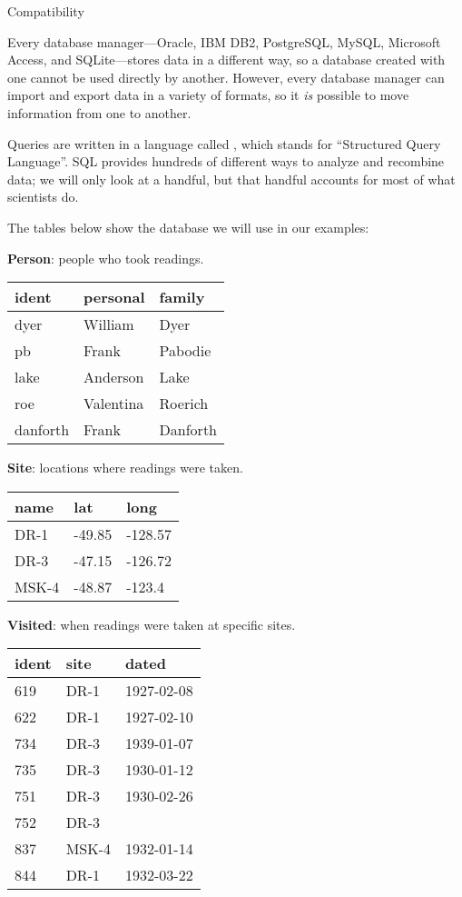 \documentclass{book}
\begin{document}
\begin{swcbox}{Compatibility}

Every database manager---Oracle, IBM DB2, PostgreSQL, MySQL, Microsoft
Access, and SQLite---stores data in a different way, so a database
created with one cannot be used directly by another. However, every
database manager can import and export data in a variety of formats, so
it \emph{is} possible to move information from one to another.

\end{swcbox}

Queries are written in a language called , which
stands for ``Structured Query Language''. SQL provides hundreds of
different ways to analyze and recombine data; we will only look at a
handful, but that handful accounts for most of what scientists do.

The tables below show the database we will use in our examples:

\textbf{Person}: people who took readings.

\begin{tabular}{lll}
ident & personal & family \\
\hline
dyer & William & Dyer \\
pb & Frank & Pabodie \\
lake & Anderson & Lake \\
roe & Valentina & Roerich \\
danforth & Frank & Danforth \\
\end{tabular}

\textbf{Site}: locations where readings were taken.

\begin{tabular}{lll}
name & lat & long \\
\hline
DR-1 & -49.85 & -128.57 \\
DR-3 & -47.15 & -126.72 \\
MSK-4 & -48.87 & -123.4 \\
\end{tabular}

\textbf{Visited}: when readings were taken at specific sites.

\begin{tabular}{lll}
ident & site & dated \\
\hline
619 & DR-1 & 1927-02-08 \\
622 & DR-1 & 1927-02-10 \\
734 & DR-3 & 1939-01-07 \\
735 & DR-3 & 1930-01-12 \\
751 & DR-3 & 1930-02-26 \\
752 & DR-3 & ~ \\
837 & MSK-4 & 1932-01-14 \\
844 & DR-1 & 1932-03-22 \\
\end{tabular}
\end{document}
